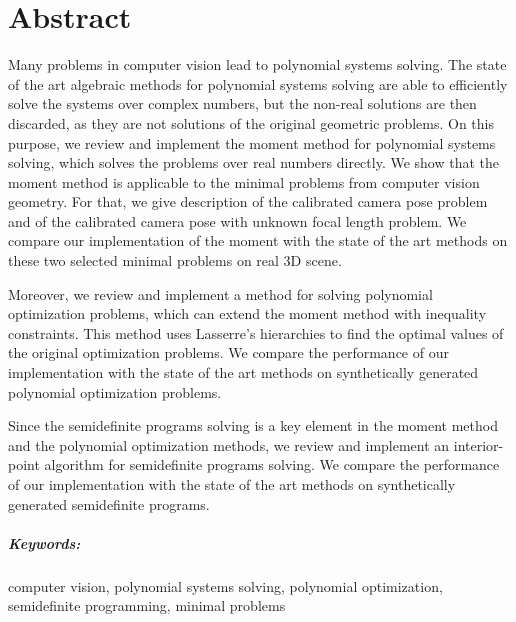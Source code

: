 \chapter*{Abstract}
Many problems in computer vision lead to polynomial systems solving.
The state of the art algebraic methods for polynomial systems solving are able to efficiently solve the systems over complex numbers, but the non-real solutions are then discarded, as they are not solutions of the original geometric problems.
On this purpose, we review and implement the moment method for polynomial systems solving, which solves the problems over real numbers directly.
We show that the moment method is applicable to the minimal problems from computer vision geometry.
For that, we give description of the calibrated camera pose problem and of the calibrated camera pose with unknown focal length problem.
We compare our implementation of the moment with the state of the art methods on these two selected minimal problems on real 3D scene.

Moreover, we review and implement a method for solving polynomial optimization problems, which can extend the moment method with inequality constraints.
This method uses Lasserre's hierarchies to find the optimal values of the original optimization problems.
We compare the performance of our implementation with the state of the art methods on synthetically generated polynomial optimization problems.

Since the semidefinite programs solving is a key element in the moment method and the polynomial optimization methods, we review and implement an interior-point algorithm for semidefinite programs solving.
We compare the performance of our implementation with the state of the art methods on synthetically generated semidefinite programs.

\paragraph{Keywords:}
computer vision, polynomial systems solving, polynomial optimization, semidefinite programming, minimal problems

